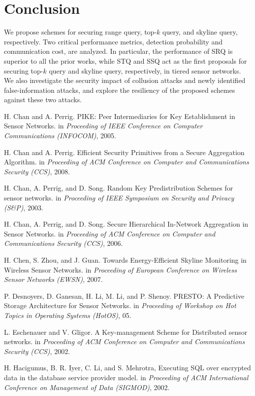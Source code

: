 \documentclass[conference]{IEEEtran}
\begin{document}
\section{Conclusion}\label{sec: Conclusion}
We propose schemes for securing range query, top-$k$ query, and skyline query, respectively. Two critical performance metrics, detection probability and communication cost, are analyzed. In particular, the performance of SRQ is superior to all the prior works, while STQ and SSQ act as the first proposals for securing top-$k$ query and skyline query, respectively, in tiered sensor networks. We also investigate the security impact of collusion attacks and newly identified false-information attacks, and explore the resiliency of the proposed schemes against these two attacks.
\begin{thebibliography}{1}
H. Chan and A. Perrig. PIKE: Peer Intermediaries for Key Establishment in Sensor Networks. in \emph{Proceeding of IEEE Conference on Computer Communications (INFOCOM)}, 2005.

H. Chan and A. Perrig. Efficient Security Primitives from a Secure Aggregation Algorithm. in \emph{Proceeding of ACM Conference on Computer and Communications Security (CCS)}, 2008.

H. Chan, A. Perrig, and D. Song. Random Key Predistribution Schemes for sensor networks. in \emph{Proceeding of IEEE Symposium on Security and Privacy (S\&P)}, 2003.

H. Chan, A. Perrig, and D. Song. Secure Hierarchical In-Network Aggregation in Sensor Networks. in \emph{Proceeding of ACM Conference on Computer and Communications Security (CCS)}, 2006.

H. Chen, S. Zhou, and J. Guan. Towards Energy-Efficient Skyline Monitoring in Wireless Sensor Networks. in \emph{Proceeding of European Conference on Wireless Sensor Networks (EWSN)}, 2007.

P. Desnoyers, D. Ganesan, H. Li, M. Li, and P. Shenoy. PRESTO: A Predictive Storage Architecture for Sensor Networks. in \emph{Proceeding of Workshop on Hot Topics in Operating Systems (HotOS)}, 05.

L. Eschenauer and V. Gligor. A Key-management Scheme for Distributed sensor networks. in \emph{Proceeding of ACM Conference on Computer and Communications Security (CCS)}, 2002.

H. Hacigumus, B. R. Iyer, C. Li, and S. Mehrotra, Executing SQL over encrypted data in the database service provider model. in \emph{Proceeding of ACM International Conference on Management of Data (SIGMOD)}, 2002.


\end{thebibliography}
\end{document}
